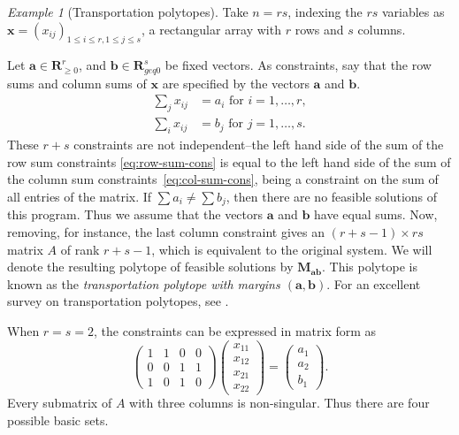 \documentclass{amsbook}
\newcommand{\xx}{\mathbf x}
\newcommand{\bb}{\mathbf b}
\renewcommand{\aa}{\mathbf a}
\newcommand{\RR}{\mathbf R}
\newcommand{\MM}{\mathbf M}
\theoremstyle{definition}
\theoremstyle{remark}
\newtheorem{example}[theorem]{Example}
\begin{document}
\begin{example}[Transportation polytopes]
  \label{example:transportation}
  Take $n=rs$, indexing the $rs$ variables as $\xx=(x_{ij})_{1\leq i\leq r,1\leq j\leq s}$, a rectangular array with $r$ rows and $s$ columns.

  Let $\aa\in \RR_{\geq 0}^r$, and $\bb\in \RR_{geq 0}^s$ be fixed vectors.
  As constraints, say that the row sums and column sums of $\xx$ are specified by the vectors $\aa$ and $\bb$.
  \begin{align}
    \tag{R}
    \label{eq:row-sum-cons}
    \sum_j x_{ij} &= a_i \text{ for } i=1,\dotsc,r,\\
    \tag{C}
    \label{eq:col-sum-cons}
    \sum_i x_{ij} &= b_j \text{ for } j=1,\dotsc,s.
  \end{align}
  These $r+s$ constraints are not independent--the left hand side of the sum of the row sum constraints \eqref{eq:row-sum-cons} is equal to the left hand side of the sum of the column sum constraints~\eqref{eq:col-sum-cons}, being a constraint on the sum of all entries of the matrix.
  If $\sum a_i\neq \sum b_j$, then there are no feasible solutions of this program.
  Thus we assume that the vectors $\aa$ and $\bb$ have equal sums.
  Now, removing, for instance, the last column constraint gives an $(r+s-1)\times rs$ matrix $A$ of rank $r+s-1$, which is equivalent to the original system.
  We will denote the resulting polytope of feasible solutions by $\MM_{\aa\bb}$.
  This polytope is known as the \emph{transportation polytope with margins $(\aa,\bb)$}.
  For an excellent survey on transportation polytopes, see \cite{DLK2014}.

  When $r=s=2$, the constraints can be expressed in matrix form as
  \begin{equation}
    \label{eq:birkhoff2}
    \begin{pmatrix}
      1 & 1 & 0 & 0\\
      0 & 0 & 1 & 1\\
      1 & 0 & 1 & 0
    \end{pmatrix}
    \begin{pmatrix}
      x_{11}\\x_{12}\\x_{21}\\x_{22}
    \end{pmatrix}
    =
    \begin{pmatrix}
      a_1\\a_2\\b_1
    \end{pmatrix}.
  \end{equation}
  Every submatrix of $A$ with three columns is non-singular.
  Thus there are four possible basic sets.
\end{example}
\end{document}
